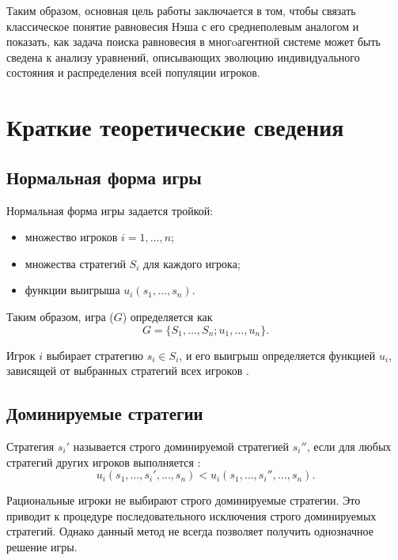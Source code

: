 \documentclass[a4paper,11pt]{article}
\begin{document}
Таким образом, основная цель работы заключается в том, чтобы связать классическое понятие равновесия Нэша с его среднеполевым аналогом и показать, как задача поиска равновесия в многoагентной системе может быть сведена к анализу уравнений, описывающих эволюцию индивидуального состояния и распределения всей популяции игроков.

\section{Краткие теоретические сведения}

\subsection{Нормальная форма игры}

Нормальная форма игры задается тройкой:
\begin{itemize}
    \item множество игроков $i = 1, \dots, n$;
    \item множества стратегий $S_i$ для каждого игрока;
    \item функции выигрыша $u_i(s_1, \dots, s_n)$.
\end{itemize}

Таким образом, игра ($G$) определяется как
\begin{equation}
G = \{S_1, \dots, S_n; u_1, \dots, u_n\}.
\end{equation}

Игрок $i$ выбирает стратегию $s_i \in S_i$, и его выигрыш определяется функцией $u_i$, зависящей от выбранных стратегий всех игроков \cite{gibbons1992game}.

\subsection{Доминируемые стратегии}

\begin{definition}
Стратегия $s_i'$ называется строго доминируемой стратегией $s_i''$, если для любых стратегий других игроков выполняется \cite{gibbons1992game}:
\begin{equation}
u_i(s_1, \dots, s_i', \dots, s_n) < u_i(s_1, \dots, s_i'', \dots, s_n).
\end{equation}
\end{definition}

Рациональные игроки не выбирают строго доминируемые стратегии. Это приводит к процедуре последовательного исключения строго доминируемых стратегий. Однако данный метод не всегда позволяет получить однозначное решение игры.
\end{document}
